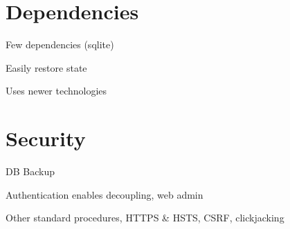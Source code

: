 \section{Dependencies}

Few dependencies (sqlite)

Easily restore state

Uses newer technologies

\section{Security}

DB Backup

Authentication enables decoupling, web admin

Other standard procedures, HTTPS \& HSTS, CSRF, clickjacking


